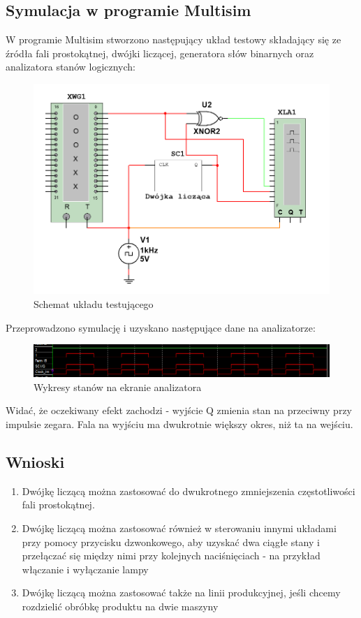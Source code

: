\documentclass[12pt,a4paper,table]{article}
\begin{document}
    \pagebreak
    \subsection{Symulacja w programie Multisim}
    W programie Multisim stworzono następujący układ testowy składający się ze źródła fali
    prostokątnej, dwójki liczącej, generatora słów binarnych oraz analizatora stanów logicznych:

    \begin{figure}[h]
        \centering
        \includegraphics[width=0.5\linewidth]{images/dwojka_test.PNG}
        \caption{Schemat układu testującego}
        \label{fig:dwojka_test}
    \end{figure}

    Przeprowadzono symulację i uzyskano następujące dane na analizatorze:

    \begin{figure}[h]
        \centering
        \includegraphics[width=\linewidth]{images/dwolka_xla.PNG}
        \caption{Wykresy stanów na ekranie analizatora}
        \label{fig:dwojka_xla}
    \end{figure}

    Widać, że oczekiwany efekt zachodzi - wyjście Q zmienia stan na przeciwny przy impulsie zegara.
    Fala na wyjściu ma dwukrotnie większy okres, niż ta na wejściu.

    \subsection{Wnioski}
    \begin{enumerate}
        \item Dwójkę liczącą można zastosować do dwukrotnego zmniejszenia częstotliwości fali
        prostokątnej.

        \item Dwójkę liczącą można zastosować również w sterowaniu innymi układami przy pomocy
        przycisku dzwonkowego, aby uzyskać dwa ciągłe stany i przełączać się między nimi przy
        kolejnych naciśnięciach - na przykład włączanie i wyłączanie lampy

        \item Dwójkę liczącą można zastosować także na linii produkcyjnej, jeśli chcemy rozdzielić
        obróbkę produktu na dwie maszyny
    \end{enumerate}
\end{document}
